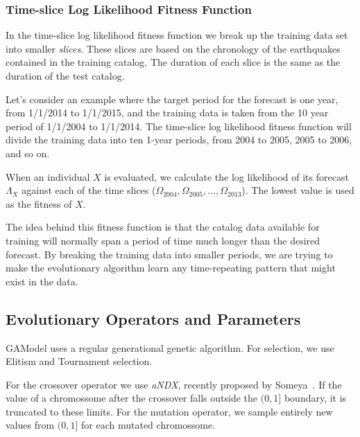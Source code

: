 \documentclass{sig-alternate}
\begin{document}
\subsubsection{Time-slice Log Likelihood Fitness Function}

In the time-slice log likelihood fitness function we break up the
training data set into smaller \emph{slices}. These slices are based
on the chronology of the earthquakes contained in the training
catalog. The duration of each slice is the same as the duration of the
test catalog.

Let's consider an example where the target period for the forecast is
one year, from 1/1/2014 to 1/1/2015, and the training data is taken
from the 10 year period of 1/1/2004 to 1/1/2014. The time-slice log
likelihood fitness function will divide the training data into ten
1-year periods, from 2004 to 2005, 2005 to 2006, and so on. 

When an individual $X$ is evaluated, we calculate the log likelihood
of its forecast $\Lambda_X$ against each of the time slices
($\Omega_{2004}, \Omega_{2005}, \dots, \Omega_{2013}$). The lowest
value is used as the fitness of $X$.

The idea behind this fitness function is that the catalog data
available for training will normally span a period of time much longer
than the desired forecast. By breaking the training data into smaller
periods, we are trying to make the evolutionary algorithm learn any
time-repeating pattern that might exist in the data.

\subsection{Evolutionary Operators and Parameters}

GAModel uses a regular generational genetic algorithm. For selection,
we use Elitism and Tournament selection. 

For the crossover operator we use \emph{aNDX}, recently proposed by
Someya~\cite{Someya2013}. If the value of a chromossome after the
crossover falls outside the $(0,1]$ boundary, it is truncated to these
  limits. For the mutation operator, we sample entirely new values
  from $(0,1]$ for each mutated chromossome.
\end{document}
